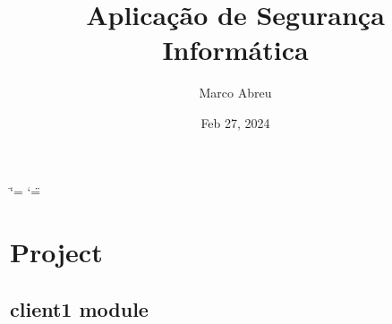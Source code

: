 \documentclass[letterpaper,10pt,english]{sphinxmanual}
\title{Aplicação de Segurança Informática}
\date{Feb 27, 2024}
\author{Marco Abreu}
\begin{document}
\ifdefined\shorthandoff
  \ifnum\catcode`\=\string=\active\shorthandoff{=}\fi
  \ifnum\catcode`\"=\active{}\fi
\fi

\pagestyle{empty}
\sphinxmaketitle
\pagestyle{plain}
\sphinxtableofcontents
\pagestyle{normal}
\label{\detokenize{index::doc}}


\sphinxstepscope


\chapter{Project}
\label{\detokenize{modules:project}}\label{\detokenize{modules::doc}}
\sphinxstepscope


\section{client1 module}
\label{\detokenize{client1:module-client1}}\label{\detokenize{client1:client1-module}}\label{\detokenize{client1::doc}}
\end{document}
